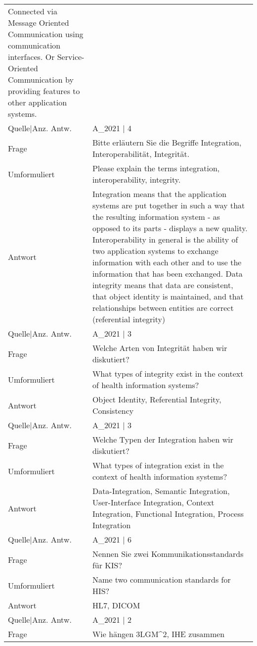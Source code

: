 {\begin{landscape}
\begin{longtable}{p{3cm}p{}}
    Connected via Message Oriented Communication using communication interfaces.
    Or Service-Oriented Communication by providing features to other application systems.\\
    Quelle|Anz. Antw. &  A\_2021  | 4 \\
    \midrule
    Frage & Bitte erläutern Sie die Begriffe Integration, Interoperabilität, Integrität. \\
    Umformuliert & Please explain the terms integration, interoperability, integrity.\\
    Antwort & Integration means that the application systems are put together in such a way that the resulting information system - as opposed to its parts - displays a new quality.
    Interoperability in general is the ability of two application systems to exchange information with each other and to use the information that has been exchanged.
    Data integrity means that data are consistent, that object identity is maintained, and that relationships between entities are correct (referential integrity) \\
    Quelle|Anz. Antw. &  A\_2021  | 3 \\
    \midrule
    Frage & Welche Arten von Integrität haben wir diskutiert? \\
    Umformuliert & What types of integrity exist in the context of health information systems? \\
    Antwort & Object Identity, Referential Integrity, Consistency \\
    Quelle|Anz. Antw. &  A\_2021  | 3 \\
    \midrule
    Frage & Welche Typen der Integration haben wir diskutiert? \\
    Umformuliert & What types of integration exist in the context of health information systems? \\
    Antwort & Data-Integration, Semantic Integration, User-Interface Integration, Context Integration, Functional Integration, Process Integration \\
    Quelle|Anz. Antw. &  A\_2021  | 6 \\
    \midrule
    Frage & Nennen Sie zwei Kommunikationsstandards für KIS? \\
    Umformuliert & Name two communication standards for HIS? \\
    Antwort & HL7, DICOM \\
    Quelle|Anz. Antw. &  A\_2021  | 2 \\
    \midrule
    Frage & Wie hängen 3LGM\textasciicircum{}2, IHE zusammen \\

\end{longtable}
\end{landscape}}
